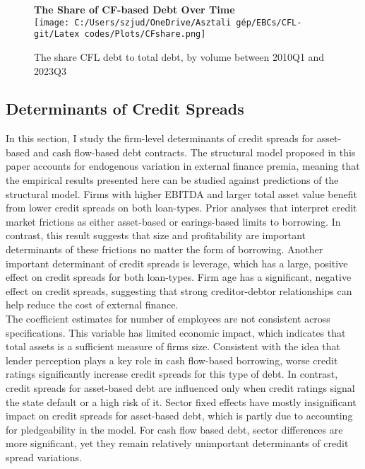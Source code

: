 \documentclass[12pt]{article}
\begin{document}
\begin{figure}[H]  %
    \centering
    \textbf{\large The Share of CF-based Debt Over Time \vspace{2mm}} \\  %
    \label{chart:CFLshare}
    \texttt{[image: C:/Users/szjud/OneDrive/Asztali gép/EBCs/CFL-git/Latex codes/Plots/CFshare.png]} \\
     \caption{\small The share CFL debt to total debt, by volume between 2010Q1 and 2023Q3}
\end{figure}

\subsection{Determinants of Credit Spreads \label{sec:credit spreads}} 
In this section, I study the firm-level determinants of credit spreads for asset-based and cash flow-based debt contracts. The structural model proposed in this paper accounts for endogenous variation in external finance premia, meaning that the empirical results presented here can be studied against predictions of the structural model. Firms with higher EBITDA and larger total asset value benefit from lower credit spreads on both loan-types. Prior analyses that interpret credit market frictions as either asset-based or earings-based limits to borrowing. In contrast, this result suggests that size and profitability are important determinants of these frictions no matter the form of borrowing. Another important determinant of credit spreads is leverage, which has a large, positive effect on credit spreads for both loan-types. Firm age has a significant, negative effect on credit spreads, suggesting that strong creditor-debtor relationships can help reduce the cost of external finance.  \vspace{3mm} \\
The coefficient estimates for number of employees are not consistent across specifications. This variable has limited economic impact, which indicates that total assets is a sufficient measure of firms size. Consistent with the idea that lender perception plays a key role in cash flow-based borrowing, worse credit ratings significantly increase credit spreads for this type of debt. In contrast, credit spreads for asset-based debt are influenced only when credit ratings signal the state default or a high risk of it. Sector fixed effects have mostly insignificant impact on credit spreads for asset-based debt, which is partly due to accounting for pledgeability in the model. For cash flow based debt, sector differences are more significant, yet they remain relatively unimportant determinants of credit spread variations. \vspace{3mm} \\
\end{document}

